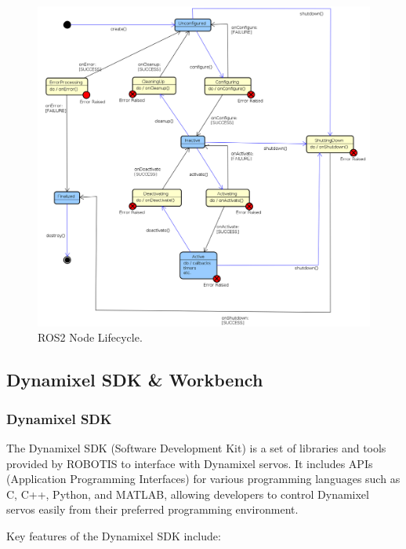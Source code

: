 \begin{figure}[t]
  \centering
  \includegraphics[width=\linewidth]{./fig/ros2_control/life_cycle_sm.png}
  \vspace{2mm}
  \caption{ROS2 Node Lifecycle. \cite{ros2lifecycle}}\label{lifecycle}
\end{figure}

\subsection{Dynamixel SDK \& Workbench}

\subsubsection{Dynamixel SDK}

The Dynamixel SDK (Software Development Kit) \cite{dynamixel-sdk} is a set of libraries and tools provided by ROBOTIS to interface with Dynamixel servos. It includes APIs (Application Programming Interfaces) for various programming languages such as C, C++, Python, and MATLAB, allowing developers to control Dynamixel servos easily from their preferred programming environment.

Key features of the Dynamixel SDK include:

